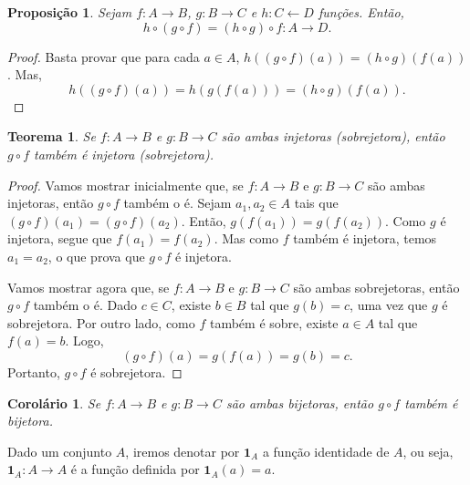 \documentclass[a4paper,12pt]{monografia}
\theoremstyle{plain}
\newtheorem{theorem}{Teorema}[section]
\newtheorem{corollary}{Corol\'ario}[section]
\newtheorem{proposition}{Proposi\c{c}\~ao}[section]
\theoremstyle{definition}
\theoremstyle{remark}
\newcommand{\id}{\mathbf{1}}
\begin{document}
\begin{proposition}
Sejam $f:A\rightarrow B$, $g:B \rightarrow C$ e $h:C\leftarrow D$
fun\c{c}\~oes. Ent\~ao,
$$
h\circ(g \circ f)=(h \circ g)\circ f:A \rightarrow D.
$$
\end{proposition}
\begin{proof}
Basta provar que para cada $a \in A$, $h((g \circ f)(a))=(h \circ
g)(f(a))$. Mas,
$$
h((g \circ f)(a))=h(g(f(a)))=(h \circ g)(f(a)).
$$
\end{proof}
\begin{theorem}
Se $f:A \rightarrow B$ e $g:B \rightarrow C$ s\~ao ambas injetoras
(sobrejetora), ent\~ao $g \circ f$ tamb\'em \'e injetora (sobrejetora).
\end{theorem}
\begin{proof}
Vamos mostrar inicialmente que, se $f:A \rightarrow B$ e $g:B
\rightarrow C$ s\~ao ambas injetoras, ent\~ao $g \circ f$ tamb\'em o \'e.
Sejam $a_1, a_2 \in A$ tais que $(g \circ f)(a_1)=(g \circ
f)(a_2)$. Ent\~ao, $g(f(a_1))=g(f(a_2))$. Como $g$ \'e injetora, segue
que $f(a_1)=f(a_2)$. Mas como $f$ tamb\'em \'e injetora, temos
$a_1=a_2$, o que prova que $g \circ f$ \'e injetora.

Vamos mostrar agora que, se $f:A \rightarrow B$ e $g:B \rightarrow
C$ s\~ao ambas sobrejetoras, ent\~ao $g \circ f$ tamb\'em o \'e. Dado $c
\in C$, existe $b \in B$ tal que $g(b)=c$, uma vez que $g$ \'e
sobrejetora. Por outro lado, como $f$ tamb\'em \'e sobre, existe $a \in A$
tal que $f(a)=b$. Logo,
$$
(g \circ f)(a)=g(f(a))=g(b)=c.
$$
Portanto, $g \circ f$ \'e sobrejetora.
\end{proof}
\begin{corollary}\label{comp-bi}
Se $f:A \rightarrow B$ e $g:B \rightarrow C$ s\~ao ambas bijetoras,
ent\~ao $g \circ f$ tamb\'em \'e bijetora.
\end{corollary}

Dado um conjunto $A$, iremos denotar por $\id_A$ a fun\c{c}\~ao
identidade de $A$, ou seja, $\id_A:A \rightarrow A$ \'e a fun\c{c}\~ao
definida por $\id_A(a)=a$.
\end{document}
